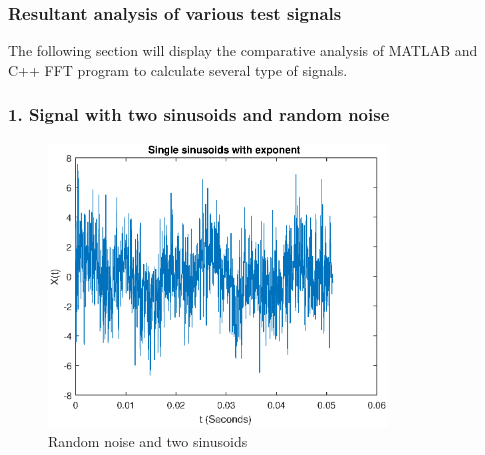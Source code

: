 
\newpage
\subsubsection{Resultant analysis of various test signals}

The following section will display the comparative analysis of MATLAB and C++ FFT program to calculate several type of signals.

\subsubsection{1. Signal with two sinusoids and random noise}

\begin{figure}[h]
	\centering
	\includegraphics[width=9cm]{./algorithms/fft/figures/random_noise.eps}
	\caption{Random noise and two sinusoids}\label{random_noise}
\end{figure}

